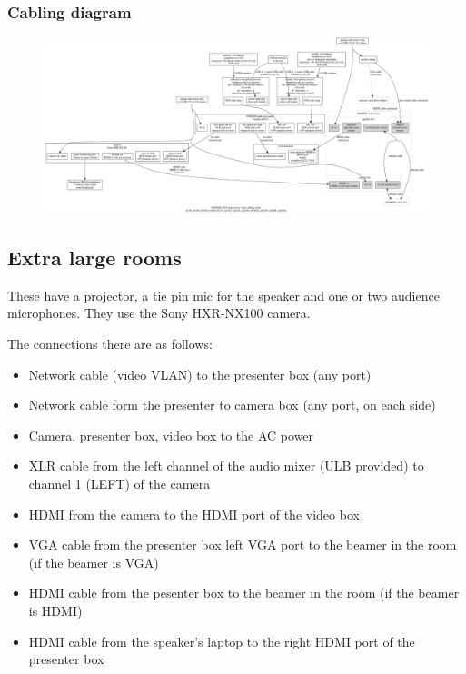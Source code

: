 \documentclass{article}
\begin{document}
\subsubsection{Cabling diagram}
\begin{figure}[H]
  \begin{sideways}
  \centering
  \includegraphics[width = 200mm]{../../graph/cabling_large_rooms.png}
  \end{sideways}
\end{figure}

\subsection{Extra large rooms}
These have a projector, a tie pin mic for the speaker and one or two audience microphones. They use the Sony HXR-NX100 camera. 

The connections there are as follows:

\begin{itemize}
  \item Network cable (video VLAN) to the presenter box (any port)
  \item Network cable form the presenter to camera box (any port, on each side)
  \item Camera, presenter box, video box to the AC power
  \item XLR cable from the left channel of the audio mixer (ULB provided) to channel 1 (LEFT) of the camera
  \item HDMI from the camera to the HDMI port of the video box
  \item VGA cable from the presenter box left VGA port to the beamer in the room (if the beamer is VGA)
  \item HDMI cable from the pesenter box to the beamer in the room (if the beamer is HDMI)
  \item HDMI cable from the speaker's laptop to the right HDMI port of the presenter box
\end{itemize}
\end{document}
